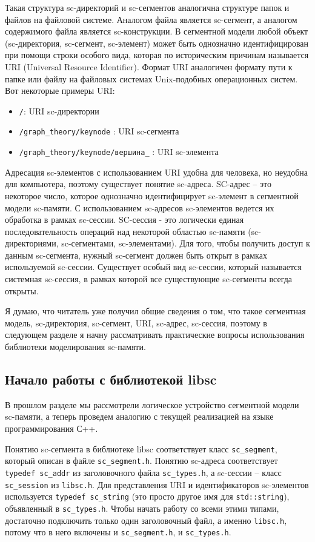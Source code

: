 Такая структура sc-директорий и sc-сегментов аналогична структуре
папок и файлов на файловой системе. Аналогом файла является
sc-сегмент, а аналогом содержимого файла является sc-конструкции. В
сегментной модели любой объект (sc-директория, sc-сегмент, sc-элемент)
может быть однозначно идентифицирован при помощи строки особого вида,
которая по историческим причинам называется URI (Universal Resource
Identifier). Формат URI аналогичен формату пути к папке или файлу на
файловых системах Unix-подобных операционных систем. Вот некоторые
примеры URI:

\begin{itemize}
\item \verb|/|: URI sc-директории
\item \verb|/graph_theory/keynode| : URI sc-сегмента
\item \verb|/graph_theory/keynode/вершина_| : URI sc-элемента
\end{itemize}

Адресация sc-элементов с использованием URI удобна для человека, но
неудобна для компьютера, поэтому существует понятие
sc-адреса. SC-адрес – это некоторое число, которое однозначно
идентифицирует sc-элемент в сегментной модели sc-памяти. С
использованием sc-адресов sc-элементов ведется их обработка в рамках
sc-сессии. SC-сессия - это логически единая последовательность
операций над некоторой областью sc-памяти (sc-директориями,
sc-сегментами, sc-элементами). Для того, чтобы получить доступ к
данным sc-сегмента, нужный sc-сегмент должен быть открыт в рамках
используемой sc-сессии. Существует особый вид sc-сессии, который
называется системная sc-сессия, в рамках которой все существующие
sc-сегменты всегда открыты.

Я думаю, что читатель уже получил общие сведения о том, что такое
сегментная модель, sc-директория, sc-сегмент, URI, sc-адрес,
sc-сессия, поэтому в следующем разделе я начну рассматривать
практические вопросы использования библиотеки моделирования sc-памяти.

\subsection{Начало работы с библиотекой libsc}

В прошлом разделе мы рассмотрели логическое устройство сегментной
модели sc-памяти, а теперь проведем аналогию с текущей реализацией на
языке программирования С++.

Понятию sc-сегмента в библиотеке libsc соответствует класс
\lstinline{sc_segment}, который описан в файле
\verb|sc_segment.h|. Понятию sc-адреса соответствует
\lstinline{typedef sc_addr} из заголовочного файла \verb|sc_types.h|,
а sc-сессии – класс \lstinline{sc_session} из \verb|libsc.h|. Для
представления URI и идентификаторов sc-элементов используется
\lstinline{typedef sc_string} (это просто другое имя для
\lstinline{std::string}), объявленный в \verb|sc_types.h|. Чтобы
начать работу со всеми этими типами, достаточно подключить только один
заголовочный файл, а именно \verb|libsc.h|, потому что в него включены
и \verb|sc_segment.h|, и \verb|sc_types.h|.

